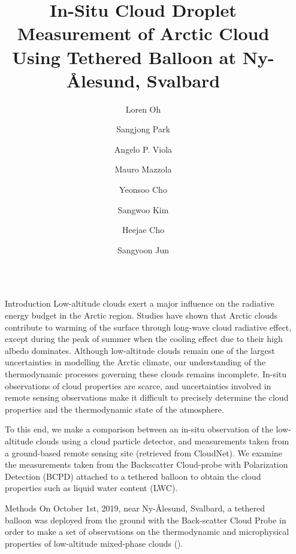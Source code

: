 \documentclass[final]{beamer}
\title{In-Situ Cloud Droplet Measurement of Arctic Cloud \\ Using Tethered Balloon at Ny-\r{A}lesund, Svalbard}
\author{
  Loren Oh \inst{1} \and
  Sangjong Park \inst{1} \and
  Angelo P. Viola \inst{2} \and
  Mauro Mazzola \inst{2} \and
  Yeonsoo Cho \inst{3} \and
  Sangwoo Kim \inst{3} \and
  Heejae Cho \inst{1} \and
  Sangyoon Jun \inst{1}
}
\institute[shortinst]{
  \inst{1} Korea Polar Research Institute (KOPRI) \samelineand 
  \inst{2} CNR Institute of Polar Sciences \samelineand
  \inst{3} Seoul National University
}
\newlength{\sepwidth}
\newlength{\colwidth}
\newcommand{\separatorcolumn}{\begin{column}{\sepwidth}\end{column}}
\begin{document}
\begin{frame}[t]
  \begin{columns}[t]
    \separatorcolumn

    \begin{column}{\colwidth}

      \begin{block}{Introduction}
        Low-altitude clouds exert a major influence on the radiative energy budget in the Arctic region. Studies have shown that Arctic clouds contribute to warming of the surface through long-wave cloud radiative effect, except during the peak of summer when the cooling effect due to their high albedo dominates. Although low-altitude clouds remain one of the largest uncertainties in modelling the Arctic climate, our understanding of the thermodynamic processes governing these clouds remains incomplete. In-situ observations of cloud properties are scarce, and uncertainties involved in remote sensing observations make it difficult to precisely determine the cloud properties and the thermodynamic state of the atmosphere.

        To this end, we make a comparison between an in-situ observation of the low-altitude clouds using a cloud particle detector, and measurements taken from a ground-based remote sensing site (retrieved from CloudNet). We examine the measurements taken from the Backscatter Cloud-probe with Polarization Detection (BCPD) attached to a tethered balloon to obtain the cloud properties such as liquid water content (LWC).
      \end{block}

      \begin{block}{Methods}
        On October 1st, 2019, near Ny-\r{A}lesund, Svalbard, a tethered balloon was deployed from the ground with the Back-scatter Cloud Probe \cite{baumgardner2014ice, thomson2014compact} in order to make a set of observations on the thermodynamic and microphysical properties of low-altitude mixed-phase clouds ().


\end{block}
\end{column}
\end{columns}
\end{frame}
\end{document}
